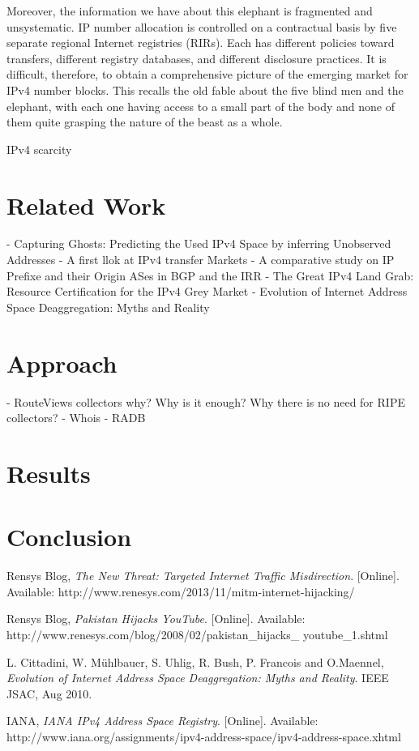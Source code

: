 \documentclass[11pt]{report}
\begin{document}
Moreover, the information we have about this elephant is fragmented and unsystematic. IP number allocation is controlled on a contractual basis by five separate regional Internet registries (RIRs). Each has different policies toward transfers, different registry databases, and different disclosure practices. It is difficult, therefore, to obtain a comprehensive picture of the emerging market for IPv4 number blocks. This recalls the old fable about the five blind men and the elephant, with each one having access to a small part of the body and none of them quite grasping the nature of the beast as a whole.



IPv4 scarcity 

\section{Related Work}
- Capturing Ghosts: Predicting the Used IPv4 Space by inferring Unobserved Addresses
- A first llok at IPv4 transfer Markets
- A comparative study on IP Prefixe and their Origin ASes in BGP and the IRR
- The Great IPv4 Land Grab: Resource Certification for the IPv4 Grey Market
- Evolution of Internet Address Space Deaggregation: Myths and Reality


\section{Approach}
 - RouteViews collectors why? Why is it enough? Why there is no need for RIPE collectors?
 - Whois
 - RADB
\section{Results}
\section{Conclusion}

\renewcommand\bibname{\section{References}}
\begin{thebibliography}{count}

    Rensys Blog,
    \emph{The New Threat: Targeted Internet Traffic Misdirection}.
    [Online]. Available: http://www.renesys.com/2013/11/mitm-internet-hijacking/


    Rensys Blog,
    \emph{Pakistan Hijacks YouTube}.
    [Online]. Available: http://www.renesys.com/blog/2008/02/pakistan\_hijacks\_
youtube\_1.shtml

	L. Cittadini, W. Mühlbauer, S. Uhlig, R. Bush, P. Francois and O.Maennel,
	\emph{Evolution of Internet Address Space Deaggregation: Myths and Reality}.
	IEEE JSAC, Aug 2010.
	
	IANA,
	\emph{IANA IPv4 Address Space Registry}.
	[Online]. Available: http://www.iana.org/assignments/ipv4-address-space/ipv4-address-space.xhtml

\end{thebibliography}	
\end{document}

